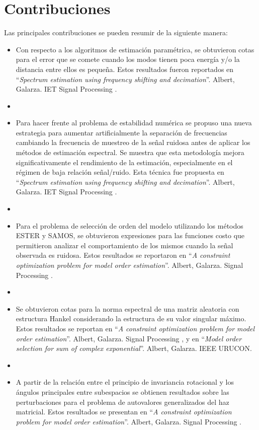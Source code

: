 \section{Contribuciones}

Las principales contribuciones se pueden resumir de la siguiente manera:
\begin{itemize}
	\item Con respecto a los algoritmos de estimación paramétrica, se obtuvieron cotas para el error que se comete cuando los modos tienen poca energía y/o la distancia entre ellos es pequeña. Estos resultados fueron reportados en ``\textit{Spectrum estimation using frequency shifting and decimation}''. Albert, Galarza. IET Signal Processing \cite{Albert2020}. 
	\item[] 
	\item Para hacer frente al problema de estabilidad numérica se propuso una nueva estrategia para aumentar artificialmente la separación de frecuencias cambiando la frecuencia de muestreo de la señal ruidosa antes de aplicar los métodos de estimación espectral. Se muestra que esta metodología mejora significativamente el rendimiento de la estimación, especialmente en el régimen de baja relación señal/ruido. Esta técnica fue propuesta en ``\textit{Spectrum estimation using frequency shifting and decimation}''. Albert, Galarza. IET Signal Processing \cite{Albert2020}.
	\item[] 
    \item Para el problema de selección de orden del modelo utilizando los métodos ESTER y SAMOS, se obtuvieron expresiones para las funciones costo que permitieron analizar el comportamiento de los mismos cuando la señal observada es ruidosa. Estos resultados se reportaron en  ``\textit{A constraint optimization problem for model order estimation}''. Albert, Galarza. Signal Processing \cite{ALBERT2023}.
    \item[]
    \item Se obtuvieron cotas para la norma espectral de una matriz aleatoria con estructura Hankel considerando la estructura de su valor singular máximo. Estos resultados se reportan en ``\textit{A constraint optimization problem for model order estimation}''. Albert, Galarza. Signal Processing \cite{ALBERT2023}, y en ``\textit{Model order selection for sum of complex exponential}''. Albert, Galarza. IEEE URUCON\cite{Albert2021}. 
    \item[] 
    \item A partir de la relación entre el principio de invariancia rotacional y los ángulos principales entre subespacios se obtienen resultados sobre las perturbaciones para el problema de autovalores generalizados del haz matricial. Estos resultados se presentan en ``\textit{A constraint optimization problem for model order estimation}''. Albert, Galarza. Signal Processing \cite{ALBERT2023}.

\end{itemize}
